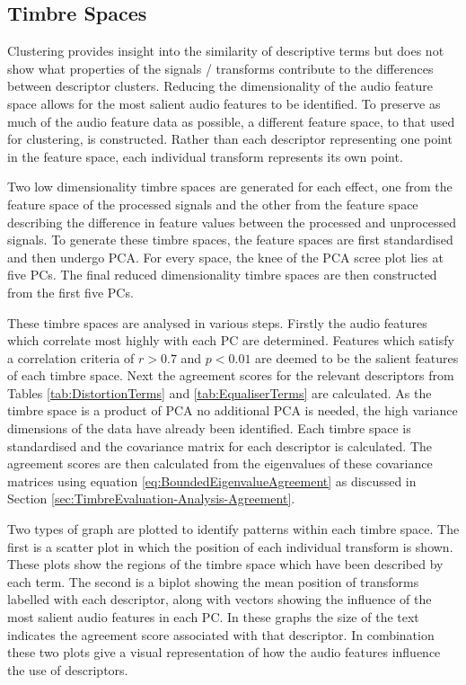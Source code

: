	\subsection{Timbre Spaces}
	\label{sec:TimbreEvaluation-Analysis-TimbreSpaces}
		Clustering provides insight into the similarity of descriptive terms but does not show what properties of
		the signals / transforms contribute to the differences between descriptor clusters. Reducing the
		dimensionality of the audio feature space allows for the most salient audio features to be identified. To
		preserve as much of the audio feature data as possible, a different feature space, to that used for
		clustering, is constructed. Rather than each descriptor representing one point in the feature space, each
		individual transform represents its own point. 

		Two low dimensionality timbre spaces are generated for each effect, one from the feature space of the
		processed signals and the other from the feature space describing the difference in feature values between
		the processed and unprocessed signals. To generate these timbre spaces, the feature spaces are first
		standardised and then undergo PCA. For every space, the knee of the PCA scree plot lies at five PCs. The
		final reduced dimensionality timbre spaces are then constructed from the first five PCs.

		These timbre spaces are analysed in various steps. Firstly the audio features which correlate most highly
		with each PC are determined. Features which satisfy a correlation criteria of $r > 0.7$ and $p < 0.01$ are
		deemed to be the salient features of each timbre space. Next the agreement scores for the relevant
		descriptors from Tables \ref{tab:DistortionTerms} and \ref{tab:EqualiserTerms} are calculated. As the
		timbre space is a product of PCA no additional PCA is needed, the high variance dimensions of the data have
		already been identified. Each timbre space is standardised and the covariance matrix for each descriptor is
		calculated. The agreement scores are then calculated from the eigenvalues of these covariance matrices
		using equation \ref{eq:BoundedEigenvalueAgreement} as discussed in Section
		\ref{sec:TimbreEvaluation-Analysis-Agreement}.
		
		Two types of graph are plotted to identify patterns within each timbre space. The first is a scatter plot
		in which the position of each individual transform is shown. These plots show the regions of the timbre
		space which have been described by each term. The second is a biplot showing the mean position of
		transforms labelled with each descriptor, along with vectors showing the influence of the most salient
		audio features in each PC. In these graphs the size of the text indicates the agreement score associated
		with that descriptor. In combination these two plots give a visual representation of how the audio features
		influence the use of descriptors.

